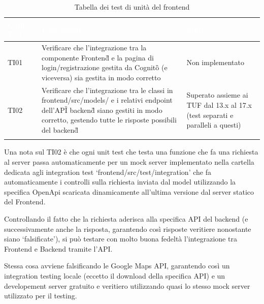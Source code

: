     {
        \setlength{\freewidth}{\dimexpr\textwidth-10\tabcolsep}
        \renewcommand{\arraystretch}{1.5}
        \centering
        \setlength{\aboverulesep}{0pt}
        \setlength{\belowrulesep}{0pt}
        \begin{longtable}{C{.3\freewidth} C{.5\freewidth} C{.3\freewidth}}
        \toprule
        \textcolor{white}{\textbf{Codice Test}}&
        \textcolor{white}{\textbf{Descrizione}}&
        \textcolor{white}{\textbf{Stato}}\\	
        \toprule
        \endhead

        TI01 & Verificare che l'integrazione tra la componente Frontend\G{} e la pagina di login/registrazione gestita da Cognito\G{} (e viceversa) 
            sia gestita in modo corretto & Non implementato \\

        TI02 & Verificare che l'integrazione tra le classi in frontend/src/models/ e i relativi endpoint dell'API\G{} backend\G{} siano
            gestiti in modo corretto, gestendo tutte le risposte possibili del backend\G{} & Superato assieme ai TUF dal 13.x al 17.x (test separati e paralleli a questi) \\

        \bottomrule
        \caption{Tabella dei test di unità del frontend}
        \end{longtable}
    }

    Una nota sul TI02 è che ogni unit test che testa una funzione che fa una richiesta al server passa automaticamente per un mock server implementato nella cartella dedicata agli integration test `frontend/src/test/integration'
    che fa automaticamente i controlli sulla richiesta inviata dal model utilizzando la specifica OpenApi scaricata dinamicamente all'ultima versione dal server statico del Frontend.

    Controllando il fatto che la richiesta aderisca alla specifica API del backend (e successivamente anche la risposta, garantendo così risposte veritiere nonostante siano `falsificate'), si può testare con molto buona fedeltà
    l'integrazione tra Frontend e Backend tramite l'API. 
    
    Stessa cosa avviene falsificando le Google Maps API, garantendo così un integration testing locale (eccetto il download della specifica API) e un developement server 
    gratuito e veritiero utilizzando quasi lo stesso mock server utilizzato per il testing.

